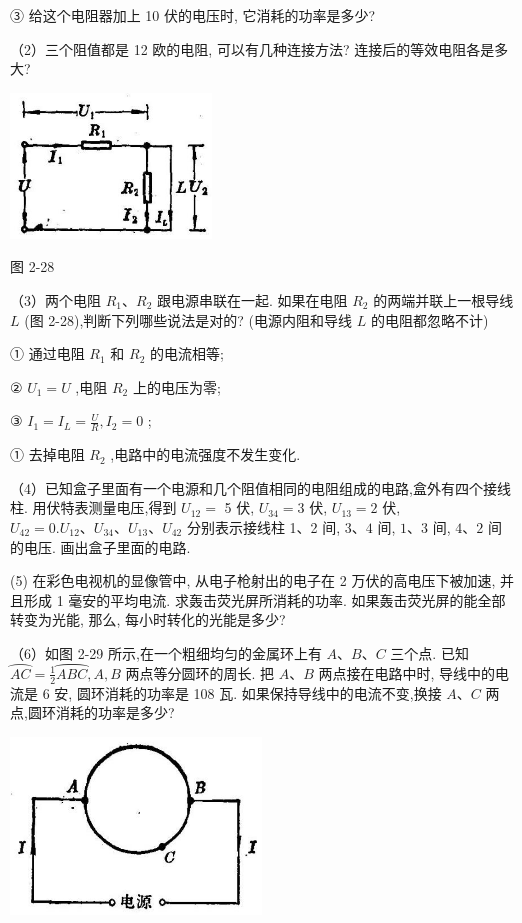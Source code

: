 \documentclass[10pt]{article}
\begin{document}
③ 给这个电阻器加上 10 伏的电压时, 它消耗的功率是多少?

（2）三个阻值都是 12 欧的电阻, 可以有几种连接方法? 连接后的等效电阻各是多大?

\begin{center}
\includegraphics[max width=0.4\textwidth]{images/01913056-1f15-74d8-9184-9aab52c9d66b_99_317798.jpg}
\end{center}

图 2-28

（3）两个电阻 \({R}_{1}\text{、}{R}_{2}\) 跟电源串联在一起. 如果在电阻 \({R}_{2}\) 的两端并联上一根导线 \(L\) (图 2-28),判断下列哪些说法是对的? (电源内阻和导线 \(L\) 的电阻都忽略不计)

① 通过电阻 \({R}_{1}\) 和 \({R}_{2}\) 的电流相等;

② \({U}_{1} = U\) ,电阻 \({R}_{2}\) 上的电压为零;

③ \({I}_{1} = {I}_{L} = \frac{U}{R},{I}_{2} = 0\) ;

① 去掉电阻 \({R}_{2}\) ,电路中的电流强度不发生变化.

（4）已知盒子里面有一个电源和几个阻值相同的电阻组成的电路,盒外有四个接线柱. 用伏特表测量电压,得到 \({U}_{12} =\) 5 伏, \({U}_{34} = 3\) 伏, \({U}_{13} = 2\) 伏, \({U}_{42} = 0.{U}_{12}\text{、}{U}_{34}\text{、}{U}_{13}\text{、}{U}_{42}\) 分别表示接线柱 1、2 间, \(3\text{、}4\) 间, \(1\text{、}3\) 间, \(4\text{、}2\) 间的电压. 画出盒子里面的电路.

(5) 在彩色电视机的显像管中, 从电子枪射出的电子在 2 万伏的高电压下被加速, 并且形成 1 毫安的平均电流. 求轰击荧光屏所消耗的功率. 如果轰击荧光屏的能全部转变为光能, 那么, 每小时转化的光能是多少?

（6）如图 2-29 所示,在一个粗细均匀的金属环上有 \(A\text{、}B\text{、}C\) 三个点. 已知 \(\overset{⏜}{AC} = \frac{1}{2}\overset{⏜}{ABC},A,B\) 两点等分圆环的周长. 把 \(A\text{、}B\) 两点接在电路中时, 导线中的电流是 6 安, 圆环消耗的功率是 108 瓦. 如果保持导线中的电流不变,换接 \(A\text{、}C\) 两点,圆环消耗的功率是多少?

\begin{center}
\includegraphics[max width=0.5\textwidth]{images/01913056-1f15-74d8-9184-9aab52c9d66b_100_577597.jpg}
\end{center}
\end{document}

